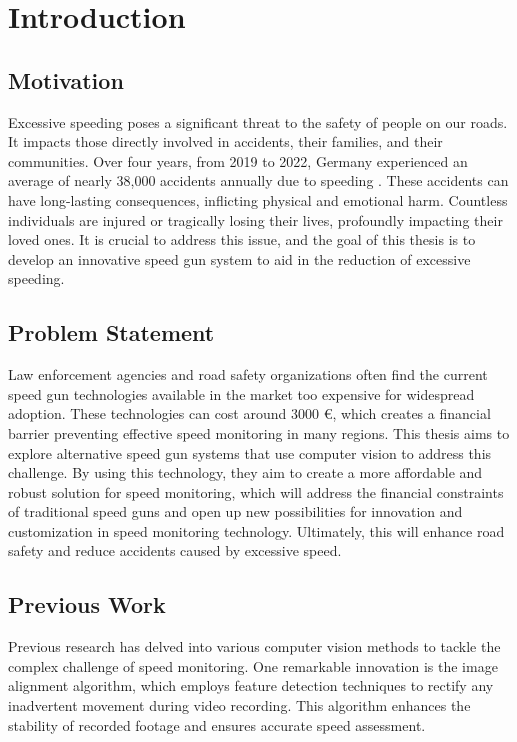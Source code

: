 \chapter{Introduction}

\section{Motivation}

Excessive speeding poses a significant threat to the safety of people on our roads. It impacts those directly involved in accidents, their families, and their communities. Over four years, from 2019 to 2022, Germany experienced an average of nearly 38,000 accidents annually due to speeding \cite{Statis_2023b}. These accidents can have long-lasting consequences, inflicting physical and emotional harm. Countless individuals are injured or tragically losing their lives, profoundly impacting their loved ones. It is crucial to address this issue, and the goal of this thesis is to develop an innovative speed gun system to aid in the reduction of excessive speeding.

\section{Problem Statement}
Law enforcement agencies and road safety organizations often find the current speed gun technologies available in the market too expensive for widespread adoption. These technologies can cost around 3000 €, which creates a financial barrier preventing effective speed monitoring in many regions. This thesis aims to explore alternative speed gun systems that use computer vision to address this challenge. By using this technology, they aim to create a more affordable and robust solution for speed monitoring, which will address the financial constraints of traditional speed guns and open up new possibilities for innovation and customization in speed monitoring technology. Ultimately, this will enhance road safety and reduce accidents caused by excessive speed.

\section{Previous Work}
Previous research has delved into various computer vision methods to tackle the complex challenge of speed monitoring. One remarkable innovation is the image alignment algorithm, which employs feature detection techniques to rectify any inadvertent movement during video recording. This algorithm enhances the stability of recorded footage and ensures accurate speed assessment.

